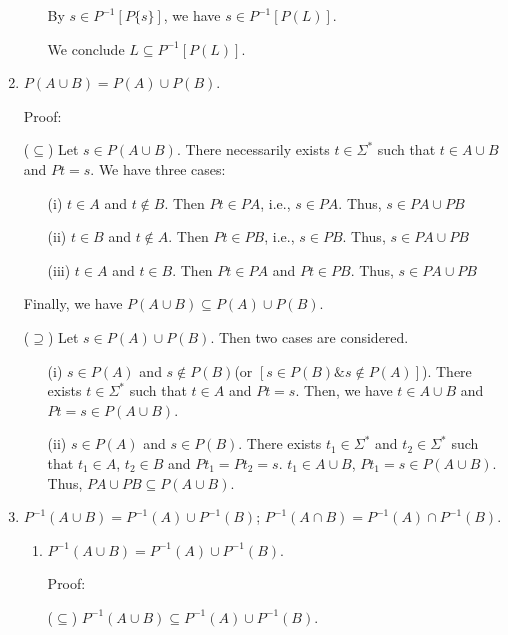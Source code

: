 \documentclass{article}
\begin{document}
\begin{enumerate}
\begin{enumerate}
    By $s \in P^{-1}[P\{s\}]$, we have $s \in P^{-1}[P(L)]$. 

    We conclude $L \subseteq P^{-1}[P(L)]$.

  \end{enumerate}
  
  \item $P(A \cup B) = P(A) \cup P(B)$.
  
  Proof:
  
  ($\subseteq$) Let $s \in P(A \cup B)$. There necessarily exists $t \in \Sigma^*$ such that $t \in A \cup B$ and $Pt = s$. We have three cases:

  \begin{itemize}
    \item[(i)] $t \in A$ and $t \notin B$. Then $Pt \in PA$, i.e., $s \in PA$. Thus, $s \in PA \cup PB$
    \item[(ii)] $t \in B$ and $t \notin A$. Then $Pt \in PB$, i.e., $s \in PB$. Thus, $s \in PA \cup PB$
    \item[(iii)] $t \in A$ and $t \in B$. Then $Pt \in PA$ and $Pt \in PB$. Thus, $s \in PA \cup PB$
  \end{itemize}

  Finally, we have $P(A \cup B) \subseteq P(A) \cup P(B)$.

  ($\supseteq$) Let $s \in P(A) \cup P(B)$. Then two cases are considered.

  \begin{itemize}
    \item[(i)] $s \in P(A)$ and $s \notin P(B)$(or $[s \in P(B) \& s \notin P(A)]$). There exists $t \in \Sigma^*$ such that $t \in A$ and $Pt = s$. Then, we have $t \in A \cup B$ and $Pt = s \in P(A \cup B) $.
    \item[(ii)] $s \in P(A)$ and $s \in P(B)$. There exists $t_1 \in \Sigma^*$ and $t_2 \in \Sigma^*$ such that $t_1 \in A$, $t_2 \in B$ and $Pt_1 = Pt_2 = s$. $t_1 \in A \cup B$, $Pt_1 = s \in P(A \cup B)$. Thus, $PA \cup PB \subseteq P(A \cup B)$.
  \end{itemize}

  
  \item $P^{-1}(A \cup B) = P^{-1}(A) \cup P^{-1}(B)$; $P^{-1}(A \cap B) = P^{-1}(A) \cap P^{-1}(B)$.
  
  \begin{enumerate}
    \item $P^{-1}(A \cup B) = P^{-1}(A) \cup P^{-1}(B)$.
    
    Proof:
    
    ($\subseteq$) $P^{-1}(A \cup B) \subseteq P^{-1}(A) \cup P^{-1}(B)$.


\end{enumerate}
\end{enumerate}
\end{document}
